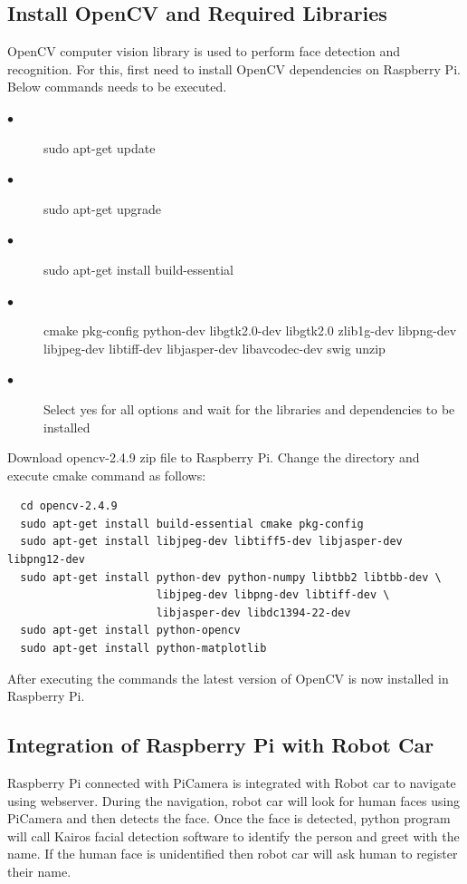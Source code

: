 \documentclass[sigconf]{acmart}
\begin{document}
\subsection{Install OpenCV and Required Libraries}
OpenCV computer vision library is used to perform face detection and recognition. For this, first need to install OpenCV dependencies on Raspberry Pi. Below commands needs to be executed. 
\begin{description}
    \item[$\bullet$] sudo apt-get update
    \item[$\bullet$] sudo apt-get upgrade
    \item[$\bullet$] sudo apt-get install build-essential
    \item[$\bullet$] cmake pkg-config python-dev libgtk2.0-dev libgtk2.0 zlib1g-dev libpng-dev libjpeg-dev libtiff-dev libjasper-dev libavcodec-dev swig unzip
    \item[$\bullet$] Select yes for all options and wait for the libraries and dependencies to be installed
\end{description}
Download opencv-2.4.9 zip file to Raspberry Pi. Change the directory and execute cmake command as follows:

\begin{verbatim}
  cd opencv-2.4.9
  sudo apt-get install build-essential cmake pkg-config
  sudo apt-get install libjpeg-dev libtiff5-dev libjasper-dev libpng12-dev
  sudo apt-get install python-dev python-numpy libtbb2 libtbb-dev \    
                       libjpeg-dev libpng-dev libtiff-dev \
                       libjasper-dev libdc1394-22-dev
  sudo apt-get install python-opencv
  sudo apt-get install python-matplotlib

\end{verbatim}

After executing the commands the latest version of OpenCV is now installed in Raspberry Pi.

\subsection{Integration of Raspberry Pi with Robot Car}
Raspberry Pi connected with PiCamera is integrated with Robot car to navigate using webserver. During the navigation, robot car will look for human faces using PiCamera and then detects the face. Once the face is detected, python program will call Kairos facial detection software to identify the person and greet with the name. If the human face is unidentified then robot car will ask human to register their name.
\end{document}
